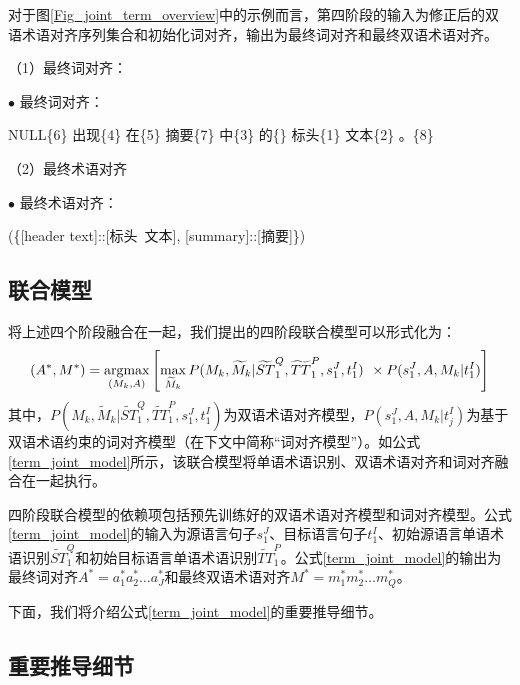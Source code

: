 对于图\ref{Fig_joint_term_overview}中的示例而言，第四阶段的输入为修正后的双语术语对齐序列集合和初始化词对齐，输出为最终词对齐和最终双语术语对齐。

\begin{center}
	\begin{boxedminipage}[h]{\linewidth}
		\small
		\quad （1）最终词对齐：
		
		\qquad \qquad $\bullet$ 最终词对齐：
		
		\qquad\qquad\qquad NULL\{6\} 出现\{4\} 在\{5\} 摘要\{7\} 中\{3\} 的\{\} 标头\{1\} 文本\{2\} 。\{8\}
		
		\quad （2）最终术语对齐
		
		\qquad \qquad $\bullet$ 最终术语对齐：
		
		\qquad\qquad\qquad (\{[header text]::[标头\ 文本], [summary]::[摘要]\})
	\end{boxedminipage}
\end{center}

\subsection{联合模型}

将上述四个阶段融合在一起，我们提出的四阶段联合模型可以形式化为：
\begin{equation}
\label{term_joint_model}
(A^*,M^*)= \mathop{\argmax}_{(M_k,A)}{\left[ \max \limits_{\widetilde{M}_k} P(M_k, \widetilde{M}_k | \widetilde{ST}_1^Q, \widetilde{TT}_1^P, s_1^J, t_1^I) \right. } \left. \vphantom{\max \limits_{\widetilde{M}_k} } \times P(s_1^J,A,M_k|t_1^I) \right]
\end{equation}
其中，$P(M_k, \widetilde{M}_k | \widetilde{ST}_1^Q, \widetilde{TT}_1^P, s_1^J, t_1^I)$为双语术语对齐模型，$P(s_1^J,A,M_k|t_j^I)$为基于双语术语约束的词对齐模型（在下文中简称“词对齐模型”）。如公式\ref{term_joint_model}所示，该联合模型将单语术语识别、双语术语对齐和词对齐融合在一起执行。

四阶段联合模型的依赖项包括预先训练好的双语术语对齐模型和词对齐模型。公式\ref{term_joint_model}的输入为源语言句子$s_1^J$、目标语言句子$t_1^I$、初始源语言单语术语识别$\widetilde{ST}_1^Q$和初始目标语言单语术语识别$\widetilde{TT}_1^P$。公式\ref{term_joint_model}的输出为最终词对齐$A^*=a_1^*a_2^*\ldots a_J^*$和最终双语术语对齐$M^*=m_1^* m_2^*\ldots m_Q^*$。

下面，我们将介绍公式\ref{term_joint_model}的重要推导细节。

\subsection{重要推导细节}

